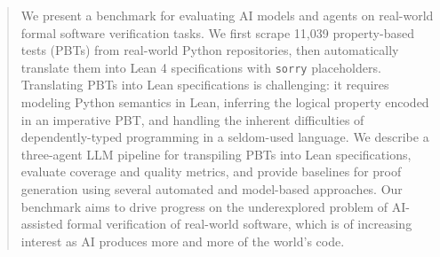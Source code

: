\begin{abstract}
We present a benchmark for evaluating AI models and agents
 on real-world formal software verification tasks.
We first scrape 11{,}039 property-based tests (PBTs) from 
real-world Python repositories, then automatically translate them into Lean 4 specifications with \texttt{sorry} placeholders. 
Translating PBTs into Lean specifications is challenging: it requires modeling Python semantics in Lean, inferring the logical property encoded in an imperative PBT, and handling the inherent difficulties of dependently-typed programming in a seldom-used language. 
We describe a three-agent LLM pipeline for transpiling PBTs into Lean specifications, evaluate coverage and quality metrics, and provide baselines for proof generation using several automated and model-based approaches. Our benchmark aims to drive progress on the underexplored problem of AI-assisted formal verification of real-world software, which is of increasing interest as AI produces more and more of the world's code.
\end{abstract}